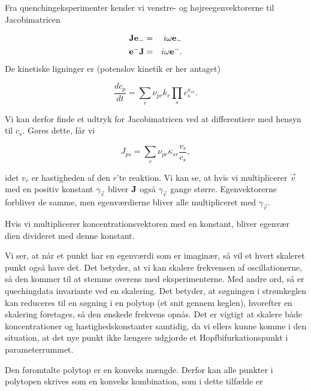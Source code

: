 \vspace{4.0mm}
Fra quenchingeksperimenter kender vi venstre- og
h{\o}jreegenvektorerne til Jacobimatricen

\begin{eqnarray*}
\mbox{${\bf J}$}\mbox{${\bf e}$}_- &=& i\omega \mbox{${\bf e}$}_- \\
\mbox{${\bf e}$}^-\mbox{${\bf J}$} &=& i\omega\mbox{${\bf e}$}^-.
\end{eqnarray*}
De kinetiske ligninger er (potenslov kinetik er her antaget)

\[
\frac{dc_p}{dt} = \sum_r \nu_{pr}k_r\prod_s c_s^{\kappa_{sr}}.
\]

Vi kan derfor finde et udtryk for Jacobimatricen ved at
differentiere med hensyn til $c_s$. G{\o}res dette, f{\aa}r
vi

\begin{equation}
J_{ps} = \sum_r \nu_{pr}\kappa_{sr}\frac{v_r}{c_s},
\end{equation}

idet $v_r$ er hastigheden af den $r$'te reaktion. Vi kan
se, at hvis vi multiplicerer $\vec{v}$ med en positiv
konstant $\gamma_{\vec{v}}$ bliver $\mbox{${\bf J}$}$ ogs{\aa}
$\gamma_{\vec{v}}$ gange st{\o}rre. Egenvektorerne
forbliver de samme, men egenv{\ae}rdierne bliver alle
multipliceret med $\gamma_{\vec{v}}$.

\vspace{4.0mm}
Hvis vi multiplicerer koncentrationsvektoren med en
konstant, bliver egen\-v{\ae}r\- dien divideret med denne
konstant.

\vspace{4.0mm}
Vi ser, at n{\aa}r et punkt har en egenv{\ae}rdi som er
imagin{\ae}r, s{\aa} vil et hvert skaleret punkt ogs{\aa}
have det. Det betyder, at vi kan skalere frekvensen af
oscillationerne, s{\aa} den kommer til at stemme overens
med eksperimenterne. Med andre ord, s{\aa} er quechingdata
invariante ved en skalering. Det betyder, at s{\o}gningen i
str{\o}mkeglen kan reduceres til en s{\o}gning i en polytop
(et snit gennem keglen), hvorefter en skalering foretages,
s{\aa} den {\o}nskede frekvens opn{\aa}s. Det er vigtigt at
skalere b{\aa}de koncentrationer og hastighedskonstanter
samtidig, da vi ellers kunne komme i den situation, at det
nye punkt ikke l{\ae}ngere udgjorde et
Hopfbifurkationspunkt i parameterrummet.

\vspace{4.0mm}
Den f{\o}romtalte polytop er en konveks m{\ae}ngde. Derfor
kan alle punkter i polytopen skrives som en konveks
kombination, som i dette tilf{\ae}lde er

